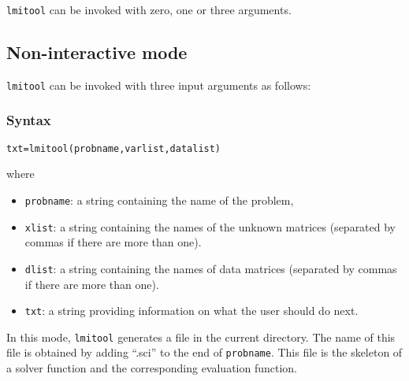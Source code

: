{\tt lmitool} can be invoked with zero, one or three arguments.

\subsection{Non-interactive mode}
{\tt lmitool} can be invoked with three input arguments as follows:

\subsubsection{Syntax}
\begin{verbatim}
txt=lmitool(probname,varlist,datalist)
\end{verbatim}
where
\begin{itemize}
\item
{\tt probname}: a string containing the name of the problem,
\item
{\tt xlist}: a string containing the names of the unknown matrices
(separated by commas if there are more than one).
\item
{\tt dlist}: a string containing the names of  data matrices (separated
by commas if there are more than one). 
\item
{\tt txt}: a string providing information on what the user should do
next.
\end{itemize}

In this mode, {\tt lmitool} generates a file in the current
directory. The name of this file is obtained by adding ``.sci''
to the end of {\tt probname}. This file is the skeleton of
a solver function and the corresponding evaluation function.

